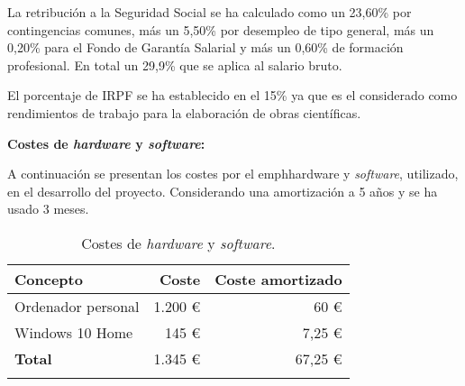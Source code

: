 La retribución\cite{SEG} a la Seguridad Social se ha calculado como un 23,60\% por contingencias comunes, más un 5,50\% por desempleo de tipo general, más un 0,20\% para el Fondo de Garantía Salarial y más un 0,60\% de formación profesional. En total un 29,9\% que se aplica al salario bruto.

El porcentaje de IRPF\cite{IRPF} se ha establecido en el 15\% ya que es el considerado como rendimientos de trabajo para la elaboración de obras científicas.

\textbf{Costes de \emph{hardware} y \emph{software}:}

A continuación se presentan los costes por el emph{hardware} y \emph{software}, utilizado, en el desarrollo del proyecto. Considerando una amortización a 5 años y se ha usado 3 meses.

\begin{longtable}[]{@{}lrr@{}}
\toprule
\begin{minipage}[b]{0.4\columnwidth}\raggedright\strut
\textbf{Concepto}\strut
\end{minipage} & \begin{minipage}[b]{0.18\columnwidth}\raggedright\strut
\textbf{Coste}\strut
\end{minipage} & \begin{minipage}[b]{0.32\columnwidth}\raggedright\strut
\textbf{Coste amortizado}\strut
\end{minipage}\tabularnewline
\midrule
\endhead
\begin{minipage}[t]{0.4\columnwidth}\raggedright\strut
Ordenador personal\strut
\end{minipage} & \begin{minipage}[t]{0.18\columnwidth}\raggedright\strut
1.200 \euro{}\strut
\end{minipage} & \begin{minipage}[t]{0.32\columnwidth}\raggedright\strut
60 \euro{}\strut
\end{minipage}\tabularnewline
\begin{minipage}[t]{0.4\columnwidth}\raggedright\strut
Windows 10 Home\strut
\end{minipage} & \begin{minipage}[t]{0.18\columnwidth}\raggedright\strut
145 \euro{}\strut
\end{minipage} & \begin{minipage}[t]{0.32\columnwidth}\raggedright\strut
7,25 \euro{}\strut
\end{minipage}\tabularnewline
\midrule
\begin{minipage}[t]{0.4\columnwidth}\raggedright\strut
\textbf{Total}\strut
\end{minipage} & \begin{minipage}[t]{0.18\columnwidth}\raggedright\strut
1.345 \euro{}\strut
\end{minipage} & \begin{minipage}[t]{0.32\columnwidth}\raggedright\strut
67,25 \euro{}\strut
\end{minipage}\tabularnewline
\bottomrule
\caption{Costes de \emph{hardware} y \emph{software}.}
\end{longtable}

